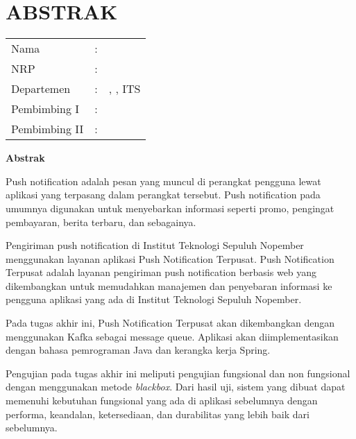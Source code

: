 \chapter {ABSTRAK}


\begin{center}
	\centering\noindent\textbf{\MakeUppercase\judul}
\end{center}
\vspace*{1em}

\begin{tabularx}{\linewidth}{ l l X }
	Nama 			& : & \penulis \\
	NRP 			& :	& \nrp \\
	Departemen 		& : & \jurusan, \newline \fakultas, ITS \\
	Pembimbing I 	& : & \pembimbingsatu \\
	Pembimbing II 	& : & \pembimbingdua
	\vspace*{1em} 	%
\end {tabularx}

\noindent\textbf{Abstrak} \\
\itshape
\par Push notification adalah pesan yang muncul di perangkat pengguna lewat aplikasi yang terpasang dalam perangkat tersebut. Push notification pada umumnya digunakan untuk menyebarkan informasi seperti promo, pengingat pembayaran, berita terbaru, dan sebagainya.
\par Pengiriman push notification di Institut Teknologi Sepuluh Nopember menggunakan layanan aplikasi Push Notification Terpusat. Push Notification Terpusat adalah layanan pengiriman push notification berbasis web yang dikembangkan untuk memudahkan manajemen dan penyebaran informasi ke pengguna aplikasi yang ada di Institut Teknologi Sepuluh Nopember.
\par Pada tugas akhir ini, Push Notification Terpusat akan dikembangkan dengan menggunakan Kafka sebagai message queue. Aplikasi akan diimplementasikan dengan bahasa pemrograman Java dan kerangka kerja Spring.
\par Pengujian pada tugas akhir ini meliputi pengujian fungsional dan non fungsional dengan menggunakan metode \textit{blackbox}. Dari hasil uji, sistem yang dibuat dapat memenuhi kebutuhan fungsional yang ada di aplikasi sebelumnya dengan performa, keandalan, ketersediaan, dan durabilitas yang lebih baik dari sebelumnya.

